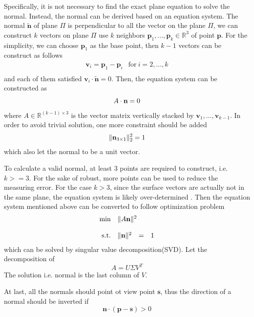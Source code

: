 Specifically, it is not necessary to find the exact plane equation to solve the normal. Instead, the normal can be derived based on an equation system. 
The normal $ \tilde{\textbf{n}} $ of plane $ \Pi $ is perpendicular to all the vector on the plane $ \Pi $, we can construct $ k $ vectors on plane $ \Pi $ use  $ k $ neighbors $ \textbf{p}_1, ..., \textbf{p}_k \in \mathbb{R}^3 $ of point $ \textbf{p} $. For the simplicity, we can choose $ \textbf{p}_1 $ as the base point, then $ k-1 $ vectors can be construct as follows
\begin{equation}
	\begin{array}{rr}
		\displaystyle \textbf{v}_i = \textbf{p}_1 - \textbf{p}_i & \text{for}\ i= 2,...,k \\
	\end{array}
\end{equation}
and each of them satisfied $ \textbf{v}_i \cdot \tilde{\textbf{n}} = 0$. Then, the equation system can be constructed as 
\begin{equation}{\label{eq:normal-overdetermined-equation}}
	A \cdot \textbf{n} = 0
\end{equation}
where $ A \in \mathbb{R}^{(k-1)\times 3} $ is the vector matrix vertically stacked by $ \textbf{v}_1, ..., \textbf{v}_{k-1} $.
In order to avoid trivial solution, one more constraint should be added
\[ \|  \textbf{n}_{3 \times 1} \|_2^2 = 1  \]
which also let the normal to be a unit vector.

To calculate a valid normal, at least 3 points are required to construct, i.e. $ k>=3 $. For the sake of robust, more points can be used to reduce the measuring error. For the case $ k>3 $, since the surface vectors are actually not in the same plane, the equation system is likely over-determined . Then the equation system mentioned above can be converted to follow optimization problem
\begin{equation}
	\begin{array}{rrclcl}
		\displaystyle \min & \multicolumn{3}{l}{\| A  \bn \|^2} \\
		\\
		\textrm{s.t.} & \| \bn \|^2 & = & 1 
	\end{array}
\end{equation}
which can be solved by singular value decomposition(SVD). Let the decomposition of 
\[ A=U\Sigma V^T \]
The solution i.e. normal is the last column of $ V $.


At last, all the normals should point ot view point $ \textbf{s} $, thus the direction of a normal should be inverted if 
\begin{equation}\label{eq:normal-invertion}
	\textbf{n} \cdot (\textbf{p}  - \textbf{s}) > 0
\end{equation}

